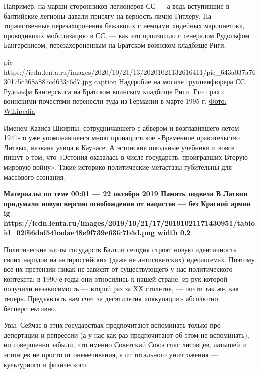 
Например, на марши сторонников легионеров СС — а ведь вступившие в балтийские
легионы давали присягу на верность лично Гитлеру. На торжественные
перезахоронения бежавших с немцами «идейных марионеток», проводивших
мобилизацию в СС, — как это произошло с генералом Рудольфом Бангерскисом,
перезахороненным на Братском воинском кладбище Риги.

\ifcmt
pic https://icdn.lenta.ru/images/2020/10/21/13/20201021132616411/pic_643a037a7630175c368a887cd633c6d7.jpg
caption Надгробие на могиле группенфюрера СС Рудольфа Бангерскиса на Братском воинском кладбище Риги. Его прах с воинскими почестями перенесли туда из Германии в марте 1995 г.  \href{https://upload.wikimedia.org/wikipedia/commons/0/06/BraluKapi_Bangerskis.jpg}{Фото: Wikipedia}
\fi


Именем Казиса Шкирпы, сотрудничавшего с абвером и возглавившего летом 1941-го
уже упоминавшееся мною пронацистское «Временное правительство Литвы», названа
улица в Каунасе. А эстонские школьные учебники и вовсе пишут о том, что
«Эстония оказалась в числе государств, проигравших Вторую мировую войну». Такие
историко-политические метастазы губительны для массового сознания.

\begin{leftbar}
	\bfseries
	Материалы по теме
00:01 — 22 октября 2019
Память подвела
\href{https://lenta.ru/articles/2019/10/22/free_riga/}{В Латвии придумали новую версию освобождения от нацистов — без Красной армии}
\ifcmt
	ig https://icdn.lenta.ru/images/2019/10/21/17/20191021171430951/tabloid_02f66daf54badae48e9f739e63fc7b5d.png
	width 0.2
\fi
\end{leftbar}

Политические элиты государств Балтии сегодня строят новую идентичность своих
народов на антироссийских (даже не антисоветских) идеологемах. Поэтому все их
претензии никак не зависят от существующего у нас политического контекста: в
1990-е годы они относились к нашей стране, из рук которой получили
независимость — второй раз за ХХ столетие, — почти так же, как теперь.
Предъявлять нам счет за десятилетия «оккупации» абсолютно бесперспективно.


Увы. Сейчас в этих государствах предпочитают вспоминать только про депортации и
репрессии (а у нас как раз предпочитают об этом не вспоминать), но совершенно
забыли, что именно Советский Союз спас литовцев, латышей и эстонцев не просто
от онемечивания, а от тотального уничтожения — культурного и физического.

